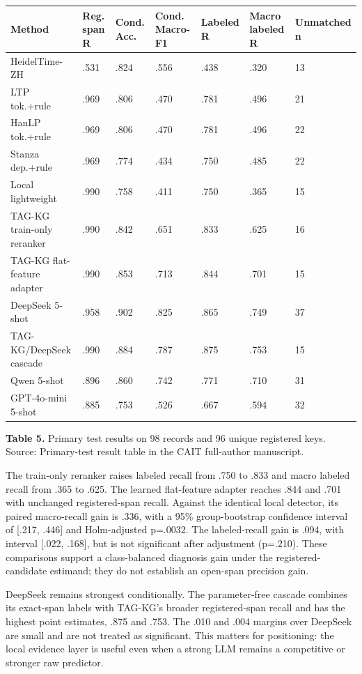 \documentclass{CUP-JNL-NLP}
\begin{document}
\begin{table}[htbp]\centering\small\begin{tabularx}{\linewidth}{lXXXXXX}\toprule
Method & Reg. span R & Cond. Acc. & Cond. Macro-F1 & Labeled R & Macro labeled R & Unmatched n \\ \midrule
HeidelTime-ZH & .531 & .824 & .556 & .438 & .320 & 13 \\
LTP tok.+rule & .969 & .806 & .470 & .781 & .496 & 21 \\
HanLP tok.+rule & .969 & .806 & .470 & .781 & .496 & 22 \\
Stanza dep.+rule & .969 & .774 & .434 & .750 & .485 & 22 \\
Local lightweight & .990 & .758 & .411 & .750 & .365 & 15 \\
TAG-KG train-only reranker & .990 & .842 & .651 & .833 & .625 & 16 \\
TAG-KG flat-feature adapter & .990 & .853 & .713 & .844 & .701 & 15 \\
DeepSeek 5-shot & .958 & .902 & .825 & .865 & .749 & 37 \\
TAG-KG/DeepSeek cascade & .990 & .884 & .787 & .875 & .753 & 15 \\
Qwen 5-shot & .896 & .860 & .742 & .771 & .710 & 31 \\
GPT-4o-mini 5-shot & .885 & .753 & .526 & .667 & .594 & 32 \\
\bottomrule\end{tabularx}\end{table}
\textbf{Table 5.} Primary test results on 98 records and 96 unique registered keys. Source: Primary-test result table in the CAIT full-author manuscript.

The train-only reranker raises labeled recall from .750 to .833 and macro labeled recall from .365 to .625. The learned flat-feature adapter reaches .844 and .701 with unchanged registered-span recall. Against the identical local detector, its paired macro-recall gain is .336, with a 95\% group-bootstrap confidence interval of [.217, .446] and Holm-adjusted p=.0032. The labeled-recall gain is .094, with interval [.022, .168], but is not significant after adjustment (p=.210). These comparisons support a class-balanced diagnosis gain under the registered-candidate estimand; they do not establish an open-span precision gain.

DeepSeek remains strongest conditionally. The parameter-free cascade combines its exact-span labels with TAG-KG's broader registered-span recall and has the highest point estimates, .875 and .753. The .010 and .004 margins over DeepSeek are small and are not treated as significant. This matters for positioning: the local evidence layer is useful even when a strong LLM remains a competitive or stronger raw predictor.
\end{document}
